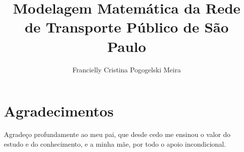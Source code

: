 \documentclass[a4paper,12pt,twoside,english,brazilian]{book}
\title{Modelagem Matemática da Rede de Transporte Público de São Paulo}[Uma análise da Rede de Ônibus Operada pela SPTrans]
\author[fem]{Francielly Cristina Pogogelski Meira}
\begin{document}

\frontmatter

\pagestyle{plain}

\onehalfspacing %

\maketitle %




\chapter*{Agradecimentos}

Agradeço profundamente ao meu pai, que desde cedo me ensinou o valor do estudo e do conhecimento, e a minha mãe, por todo o apoio incondicional.





\cleardoublepage
\end{document}
